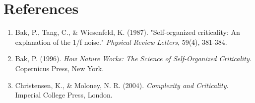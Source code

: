 \documentclass[11pt, a4paper]{article}
\begin{document}
\section*{References}
\begin{enumerate}
    \item Bak, P., Tang, C., \& Wiesenfeld, K. (1987). "Self-organized criticality: An explanation of the 1/f noise." \textit{Physical Review Letters}, 59(4), 381-384.
    \item Bak, P. (1996). \textit{How Nature Works: The Science of Self-Organized Criticality}. Copernicus Press, New York.
    \item Christensen, K., \& Moloney, N. R. (2004). \textit{Complexity and Criticality}. Imperial College Press, London.
\end{enumerate}
\end{document}
